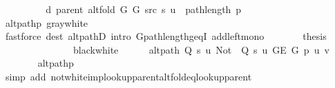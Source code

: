 \begin{isabellebody}
\ \ \ \ \isamarkupfalse%
\ \isamarkupfalse%
\ {\isachardoublequoteopen}{\isachardot}{\kern0pt}{\isachardot}{\kern0pt}{\isachardot}{\kern0pt}\ {\isasymle}\ d\ {\isacharparenleft}{\kern0pt}parent\ {\isacharparenleft}{\kern0pt}alt{\isacharunderscore}{\kern0pt}fold\ G{}\ G{}\ src\ s{\isacharparenright}{\kern0pt}{\isacharparenright}{\kern0pt}\ u\ {\isacharplus}{\kern0pt}\ path{\isacharunderscore}{\kern0pt}length\ p{\isachardoublequoteclose}\isanewline
\ \ \ \ \ \ \isamarkupfalse%
\ alt{\isacharunderscore}{\kern0pt}path{\isacharunderscore}{\kern0pt}p\ gray{\isacharunderscore}{\kern0pt}white\isanewline
\ \ \ \ \ \ \isamarkupfalse%
\ {\isacharparenleft}{\kern0pt}fastforce\ dest{\isacharcolon}{\kern0pt}\ alt{\isacharunderscore}{\kern0pt}pathD{\isacharparenleft}{\kern0pt}{}{\isacharparenright}{\kern0pt}\ intro{\isacharcolon}{\kern0pt}\ G{\isachardot}{\kern0pt}path{\isacharunderscore}{\kern0pt}length{\isacharunderscore}{\kern0pt}geq{\isacharunderscore}{\kern0pt}{}I\ add{\isacharunderscore}{\kern0pt}left{\isacharunderscore}{\kern0pt}mono{\isacharparenright}{\kern0pt}\isanewline
\ \ \ \ \isamarkupfalse%
\ \isamarkupfalse%
\ {\isacharquery}{\kern0pt}thesis\isanewline
\ \ \ \ \ \ \isacommand{{\isachardot}{\kern0pt}}\isamarkupfalse%
\isanewline
\ \ \isamarkupfalse%
\isanewline
\ \ \ \ \isamarkupfalse%
\ black{\isacharunderscore}{\kern0pt}white\isanewline
\ \ \ \ \isamarkupfalse%
\ {\isachardoublequoteopen}alt{\isacharunderscore}{\kern0pt}path\ {\isacharparenleft}{\kern0pt}Q\ s\ u{\isacharparenright}{\kern0pt}\ {\isacharparenleft}{\kern0pt}Not\ {\isasymcirc}\ Q\ s\ u{\isacharparenright}{\kern0pt}\ {\isacharparenleft}{\kern0pt}G{\isachardot}{\kern0pt}E\ G{\isacharparenright}{\kern0pt}\ p\ u\ v{\isachardoublequoteclose}\isanewline
\ \ \ \ \ \ \isamarkupfalse%
\ alt{\isacharunderscore}{\kern0pt}path{\isacharunderscore}{\kern0pt}p\isanewline
\ \ \ \ \ \ \isamarkupfalse%
\ {\isacharparenleft}{\kern0pt}simp\ add{\isacharcolon}{\kern0pt}\ not{\isacharunderscore}{\kern0pt}white{\isacharunderscore}{\kern0pt}imp{\isacharunderscore}{\kern0pt}lookup{\isacharunderscore}{\kern0pt}parent{\isacharunderscore}{\kern0pt}alt{\isacharunderscore}{\kern0pt}fold{\isacharunderscore}{\kern0pt}eq{\isacharunderscore}{\kern0pt}lookup{\isacharunderscore}{\kern0pt}parent{\isacharparenright}{\kern0pt}\isanewline
\ \ \ \ \isamarkupfalse%
\ \isamarkupfalse%

\end{isabellebody}
